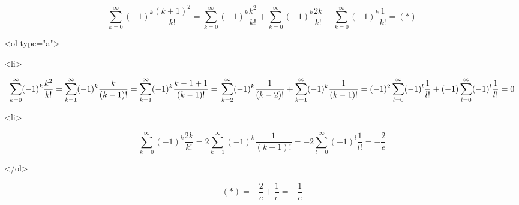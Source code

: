 $$\sum\limits_{k=0}^\infty (-1)^k \frac{(k+1)^2}{k!}=\sum\limits_{k=0}^\infty(-1)^k\frac{k^2}{k!}+\sum\limits_{k=0}^\infty (-1)^k\frac{2k}{k!}+\sum\limits_{k=0}^\infty(-1)^k \frac{1}{k!}=(*)$$

<ol type="a">

<li>

$$\sum\limits_{k=0}^\infty(-1)^k\frac{k^2}{k!}=\sum\limits_{k=1}^\infty(-1)^k\frac{k}{(k-1)!}=\sum\limits_{k=1}^\infty(-1)^k\frac{k-1+1}{(k-1)!}=\\\sum\limits_{k=2}^\infty(-1)^k\frac{1}{(k-2)!}+\sum\limits_{k=1}^\infty(-1)^k\frac{1}{(k-1)!}=(-1)^2\sum\limits_{l=0}^\infty(-1)^l\frac{1}{l!}+(-1)\sum\limits_{l=0}^\infty(-1)^l\frac{1}{l!}=0$$

<li>

$$\sum\limits_{k=0}^\infty (-1)^k\frac{2k}{k!}=2\sum\limits_{k=1}^\infty (-1)^k\frac{1}{(k-1)!}=-2\sum\limits_{l=0}^\infty (-1)^l\frac{1}{l!}=-\frac{2}{e}$$

</ol>

$$(*)=-\frac{2}{e}+\frac{1}{e}=-\frac{1}{e} $$
